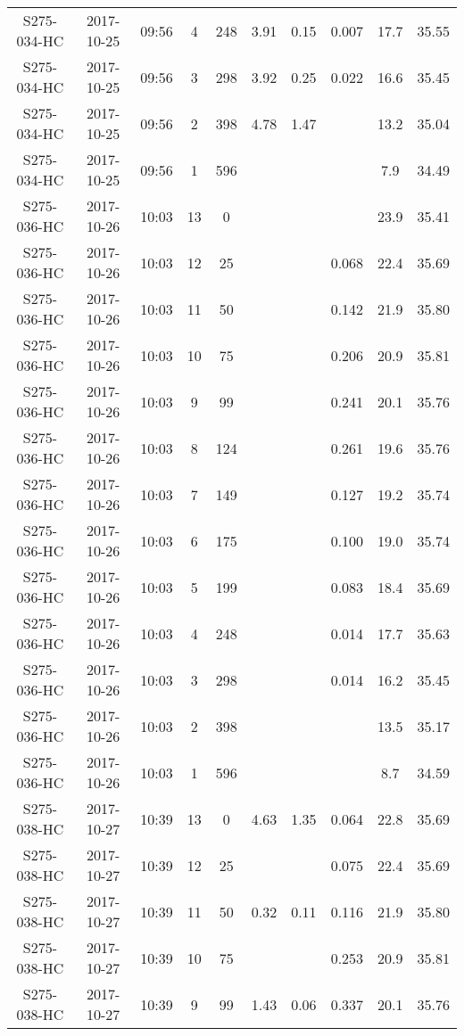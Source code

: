 \begin{longtable}{cccccccccc}
  S275-034-HC & 2017-10-25 & 09:56 & 4 & 248 & 3.91 & 0.15 & 0.007 & 17.7 & 35.55 \\ 
  S275-034-HC & 2017-10-25 & 09:56 & 3 & 298 & 3.92 & 0.25 & 0.022 & 16.6 & 35.45 \\ 
  S275-034-HC & 2017-10-25 & 09:56 & 2 & 398 & 4.78 & 1.47 &  & 13.2 & 35.04 \\ 
  S275-034-HC & 2017-10-25 & 09:56 & 1 & 596 &  &  &  & 7.9 & 34.49 \\ 
  S275-036-HC & 2017-10-26 & 10:03 & 13 & 0 &  &  &  & 23.9 & 35.41 \\ 
  S275-036-HC & 2017-10-26 & 10:03 & 12 & 25 &  &  & 0.068 & 22.4 & 35.69 \\ 
  S275-036-HC & 2017-10-26 & 10:03 & 11 & 50 &  &  & 0.142 & 21.9 & 35.80 \\ 
  S275-036-HC & 2017-10-26 & 10:03 & 10 & 75 &  &  & 0.206 & 20.9 & 35.81 \\ 
  S275-036-HC & 2017-10-26 & 10:03 & 9 & 99 &  &  & 0.241 & 20.1 & 35.76 \\ 
  S275-036-HC & 2017-10-26 & 10:03 & 8 & 124 &  &  & 0.261 & 19.6 & 35.76 \\ 
  S275-036-HC & 2017-10-26 & 10:03 & 7 & 149 &  &  & 0.127 & 19.2 & 35.74 \\ 
  S275-036-HC & 2017-10-26 & 10:03 & 6 & 175 &  &  & 0.100 & 19.0 & 35.74 \\ 
  S275-036-HC & 2017-10-26 & 10:03 & 5 & 199 &  &  & 0.083 & 18.4 & 35.69 \\ 
  S275-036-HC & 2017-10-26 & 10:03 & 4 & 248 &  &  & 0.014 & 17.7 & 35.63 \\ 
  S275-036-HC & 2017-10-26 & 10:03 & 3 & 298 &  &  & 0.014 & 16.2 & 35.45 \\ 
  S275-036-HC & 2017-10-26 & 10:03 & 2 & 398 &  &  &  & 13.5 & 35.17 \\ 
  S275-036-HC & 2017-10-26 & 10:03 & 1 & 596 &  &  &  & 8.7 & 34.59 \\ 
  S275-038-HC & 2017-10-27 & 10:39 & 13 & 0 & 4.63 & 1.35 & 0.064 & 22.8 & 35.69 \\ 
  S275-038-HC & 2017-10-27 & 10:39 & 12 & 25 &  &  & 0.075 & 22.4 & 35.69 \\ 
  S275-038-HC & 2017-10-27 & 10:39 & 11 & 50 & 0.32 & 0.11 & 0.116 & 21.9 & 35.80 \\ 
  S275-038-HC & 2017-10-27 & 10:39 & 10 & 75 &  &  & 0.253 & 20.9 & 35.81 \\ 
  S275-038-HC & 2017-10-27 & 10:39 & 9 & 99 & 1.43 & 0.06 & 0.337 & 20.1 & 35.76 \\ 

\end{longtable}

